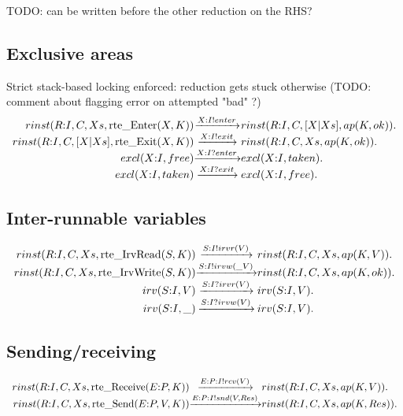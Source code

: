 TODO: can  be written before the other reduction on the RHS?



\subsection{Exclusive areas}

Strict stack-based locking enforced: reduction gets stuck otherwise
(TODO: comment about flagging error on attempted "bad" ?)
\[
\begin{array}{r@{}c@{}l}
  \Preduce{rinst(R{:}I, C, Xs,     \rte{Enter}(X,K))}{\Psay{X{:}I}{enter}} {rinst(R{:}I, C, [X|Xs], ap(K,ok))}  .
\\\Preduce{rinst(R{:}I, C, [X|Xs], \rte{Exit}(X,K))} {\Psay{X{:}I}{exit}}  {rinst(R{:}I, C, Xs,     ap(K,ok))}      .
\\\Preduce{excl(X{:}I, free)}                     {\Phear{X{:}I}{enter}}{excl(X{:}I, taken)}                 .
\\\Preduce{excl(X{:}I, taken)}                    {\Phear{X{:}I}{exit}} {excl(X{:}I, free)}                  .
\end{array}
\]
\subsection{Inter-runnable variables}

\[
\begin{array}{r@{}c@{}l}
  \Preduce{rinst(R{:}I, C, Xs, \rte{IrvRead}(S,K))} {\Psay{S{:}I}{irvr(V)}}  {rinst(R{:}I, C, Xs, ap(K,V))}  .
\\\Preduce{rinst(R{:}I, C, Xs, \rte{IrvWrite}(S,K))}{\Psay{S{:}I}{irvw(\_V)}}{rinst(R{:}I, C, Xs, ap(K,ok))} .
\\\Preduce{irv(S{:}I, V)}                           {\Phear{S{:}I}{irvr(V)}} {irv(S{:}I, V)}                 .
\\\Preduce{irv(S{:}I,\_)}                           {\Phear{S{:}I}{irvw(V)}} {irv(S{:}I, V)}                 .
\end{array}
\]


\subsection{Sending/receiving}

\[
\begin{array}{r@{}c@{}l}
  \Preduce{rinst(R{:}I, C, Xs, \rte{Receive}(E{:}P,K))}{\Psay{E{:}P{:}I}{rcv(V)}}    {rinst(R{:}I, C, Xs, ap(K,V))} .
\\\Preduce{rinst(R{:}I, C, Xs, \rte{Send}(E{:}P,V,K))} {\Psay{E{:}P{:}I}{snd(V,Res)}}{rinst(R{:}I, C, Xs, ap(K,Res))}.
\end{array}
\]

